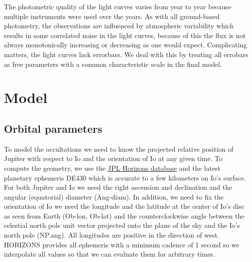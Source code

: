 \documentclass[modern]{aastex62}
\begin{document}
The photometric quality of the light curves varies from year to year because multiple instruments were used over the years. 
As with all ground-based photometry, the observations are influenced by atmospheric variability which results in some correlated noise in the light curves, because of this the flux is not always monotonically increasing or decreasing as one would expect.
Complicating matters, the light curves lack errorbars. 
We deal with this by treating all errobars as free parameters with a common characteristic scale in the final model.


\section{Model}
\label{sec:model}
\subsection{Orbital parameters}
\label{ssec:orbital_parameters}
To model the occultations we need to know the projected relative position of Jupiter with respect to Io and the orientation of Io at any given time.
To compute the geometry, we use the \href{https://ssd.jpl.nasa.gov/horizons.cgi}{JPL Horizons database} and the latest planetary ephemeris DE430 \citep{folkner2014} which is accurate to a few kilometers on Io's surface.
For both Jupiter and Io we need the right ascension and declination and the angular (equatorial) diameter (\textsf{Ang-diam}).
In addition, we need to fix the orientation of Io we need the longitude and the latitude at the center of Io's disc as seen from Earth (\textsf{Ob-lon}, \textsf{Ob-lat}) and the counterclockwise angle between the celestial north pole unit vector projected onto the plane of the sky and the Io's north pole (\textsf{NP.ang}).
All longitudes are positive  in the direction of west.
\textsf{HORIZONS} provides all ephemeris with a minimum cadence of 1 second so we interpolate all values so that we can evaluate them for arbitrary times.
\end{document}
